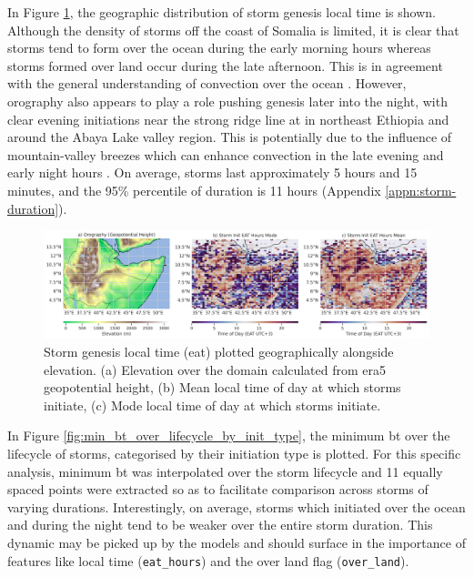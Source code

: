In Figure \ref{fig:orography_storm_init_eat_hours_mode_mean}, the geographic distribution of storm genesis local time is shown. Although the density of storms off the coast of Somalia is limited, it is clear that storms tend to form over the ocean during the early morning hours whereas storms formed over land occur during the late afternoon. This is in agreement with the general understanding of convection over the ocean \citep{Hall1999,Houze2004}. However, orography also appears to play a role pushing genesis later into the night, with clear evening initiations near the strong ridge line at  in northeast Ethiopia and around the Abaya Lake valley region. This is potentially due to the influence of mountain-valley breezes which can enhance convection in the late evening and early night hours \citep{Zardi2013}. On average, storms last approximately 5 hours and 15 minutes, and the 95\% percentile of duration is 11 hours (Appendix \ref{appn:storm-duration}).

\begin{figure}[ht]
    \centering
    \includegraphics[width=\textwidth]{../figures/generated/exploration/orography_storm_init_eat_hours_mode_mean.png}
    \caption{Storm genesis local time (\acrlong{eat}) plotted geographically alongside elevation. (a) Elevation over the domain calculated from \acrshort{era5} geopotential height, (b) Mean local time of day at which storms initiate, (c) Mode local time of day at which storms initiate.}
    \label{fig:orography_storm_init_eat_hours_mode_mean}
\end{figure}

In Figure \ref{fig:min_bt_over_lifecycle_by_init_type}, the minimum \acrfull{bt} over the lifecycle of storms, categorised by their initiation type is plotted. For this specific analysis, minimum \acrshort{bt} was interpolated over the storm lifecycle and 11 equally spaced points were extracted so as to facilitate comparison across storms of varying durations. Interestingly, on average, storms which initiated over the ocean and during the night tend to be weaker over the entire storm duration. This dynamic may be picked up by the models and should surface in the importance of features like local time (\texttt{eat\_hours}) and the over land flag (\texttt{over\_land}). 

